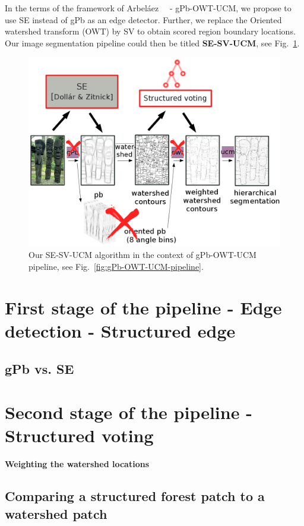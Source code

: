 In the terms of the framework of Arbel\'aez~\etal~\cite{Arbelaez11} - gPb-OWT-UCM, we propose to use SE instead of gPb as an edge detector. Further, we replace the Oriented watershed transform (OWT) by SV to obtain scored region boundary locations. Our image segmentation pipeline could then be titled \textbf{SE-SV-UCM}, see Fig.~\ref{fig:SE-SV-UCM-pipeline}.

\begin{figure}[ht!]
\centering
 \includegraphics[width=1\textwidth]{images/SE-SV-UCM/SE-SV-UCM_pipeline.png}
\caption{Our SE-SV-UCM algorithm in the context of gPb-OWT-UCM pipeline, see Fig.~\protect\ref{fig:gPb-OWT-UCM-pipeline}.}
\label{fig:SE-SV-UCM-pipeline}
\end{figure}

\section{First stage of the pipeline - Edge detection - Structured edge}
\subsection{gPb vs. SE}

\section{Second stage of the pipeline - Structured voting}

\textbf{Weighting the watershed locations}
\subsection{Comparing a structured forest patch to a watershed patch}

